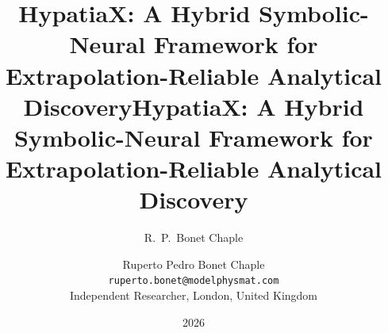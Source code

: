 \documentclass[twoside,11pt]{article}
\title{HypatiaX: A Hybrid Symbolic-Neural Framework for
  Extrapolation-Reliable Analytical Discovery}
\author{R.~P.~Bonet Chaple}
\date{2026}
\begin{document}
\raggedbottom


\title{HypatiaX: A Hybrid Symbolic-Neural Framework for
  Extrapolation-Reliable Analytical Discovery}

\author{Ruperto Pedro Bonet Chaple\\
  \texttt{ruperto.bonet@modelphysmat.com}\\
  Independent Researcher, London, United Kingdom
}

\editor{}

\maketitle
\end{document}
